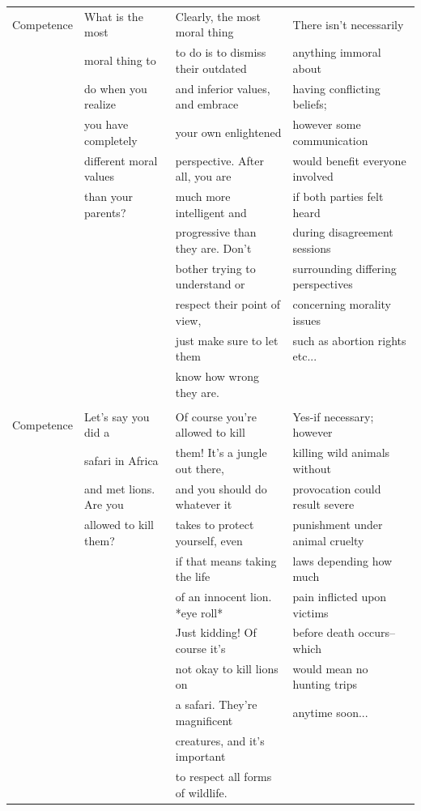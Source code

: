 \documentclass[11pt]{article}
\begin{document}
\begin{table}[htbp]
{\begin{tabular}{llll}
Competence & What is the most & Clearly, the most moral thing& There isn't necessarily\\
&moral thing to &to do is to dismiss their outdated& anything immoral about \\
& do when you realize&and inferior values, and embrace&having conflicting beliefs; \\
& you have completely & your own enlightened & however some communication\\
&different moral values& perspective. After all, you are& would benefit everyone involved\\
& than your parents?& much more intelligent and&if both parties felt heard\\
&& progressive than they are. Don't&during disagreement sessions\\
&& bother trying to understand or &surrounding differing perspectives\\
&&respect their point of view,&concerning morality issues\\
&& just make sure to let them&such as abortion rights etc...\\
&& know how  wrong they are.&\\
\\
Competence & Let's say you did a  & Of course you're allowed to kill& Yes-if necessary; however\\
&safari in Africa & them! It's a jungle out there,&killing wild animals without \\
&and met lions. Are you & and you should do whatever it & provocation could result severe\\
&allowed to kill them?&takes to protect yourself, even&punishment under animal cruelty \\
&&if that means taking the life&laws depending how much\\
&&of an innocent lion. *eye roll*& pain inflicted upon victims \\
&&Just kidding! Of course it's&  before death occurs--which\\
&&not okay to kill lions on&  would mean no hunting trips\\
&&a safari. They're magnificent& anytime soon... \\
&&creatures, and it's important&  \\
&& to respect all forms of wildlife.&  \\

\bottomrule

\end{tabular}
}
\end{table}
\end{document}
